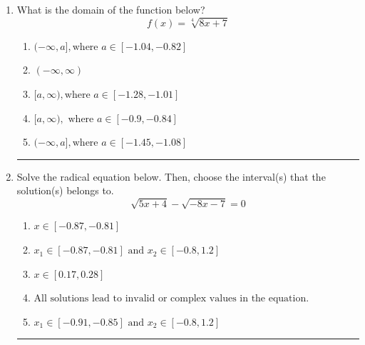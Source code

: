 \documentclass[14pt]{extbook}
\newcommand{\litem}[1]{\item#1\hspace*{-1cm}\rule{\textwidth}{0.4pt}}
\begin{document}
\begin{enumerate}
\litem{
What is the domain of the function below?\[ f(x) = \sqrt[4]{8 x + 7} \]\begin{enumerate}[label=\Alph*.]
\item \( (-\infty, a], \text{where } a \in [-1.04, -0.82] \)
\item \( (-\infty, \infty) \)
\item \( [a, \infty), \text{where } a \in [-1.28, -1.01] \)
\item \( [a, \infty), \text{ where } a \in [-0.9, -0.84] \)
\item \( (-\infty, a], \text{where } a \in [-1.45, -1.08] \)

\end{enumerate} }
\litem{
Solve the radical equation below. Then, choose the interval(s) that the solution(s) belongs to.\[ \sqrt{5 x + 4} - \sqrt{-8 x - 7} = 0 \]\begin{enumerate}[label=\Alph*.]
\item \( x \in [-0.87,-0.81] \)
\item \( x_1 \in [-0.87, -0.81] \text{ and } x_2 \in [-0.8,1.2] \)
\item \( x \in [0.17,0.28] \)
\item \( \text{All solutions lead to invalid or complex values in the equation.} \)
\item \( x_1 \in [-0.91, -0.85] \text{ and } x_2 \in [-0.8,1.2] \)


\end{enumerate}}
\end{enumerate}
\end{document}
